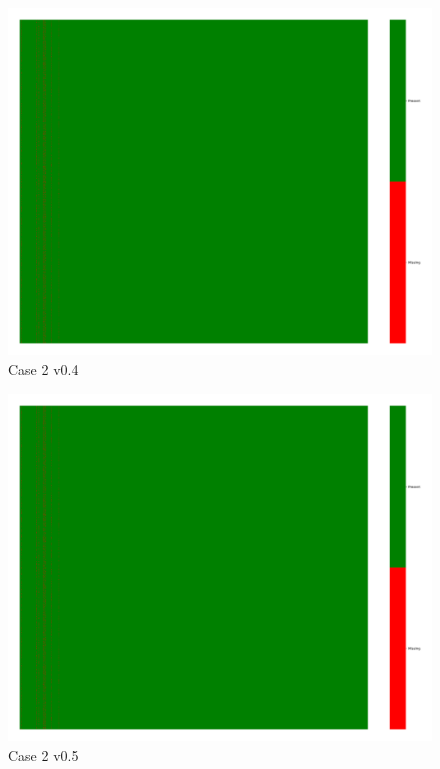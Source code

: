 \documentclass[a4paper,12pt]{article}
\begin{document}
\begin{figure}[H]
    \includegraphics[width=\linewidth]{case2_v0.4_heatmap_cleaned.png}
    \caption*{Case 2 v0.4}
\end{figure}

\begin{figure}[H]
    \includegraphics[width=\linewidth]{case2_v0.5_heatmap_cleaned.png}
    \caption*{Case 2 v0.5}
\end{figure}
\end{document}
